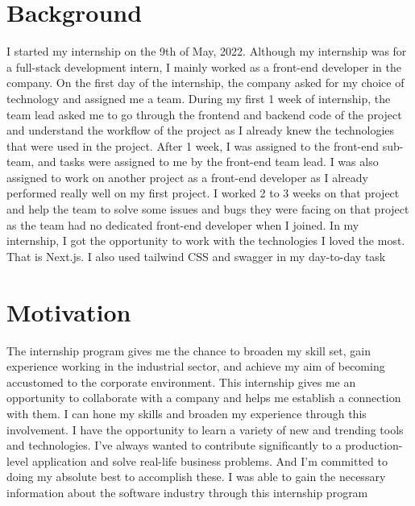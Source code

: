 \section{Background}
\begin{flushleft}
    I started my internship on the 9th of May, 2022. Although my internship was for a full-stack
development intern, I mainly worked as a front-end developer in the company. On the first day of
the internship, the company asked for my choice of technology and assigned me a team. During
my first 1 week of internship, the team lead asked me to go through the frontend and backend
code of the project and understand the workflow of the project as I already knew the
technologies that were used in the project. After 1 week, I was assigned to the front-end
sub-team, and tasks were assigned to me by the front-end team lead.
I was also assigned to work on another project as a front-end developer as I already performed
really well on my first project. I worked 2 to 3 weeks on that project and help the team to solve
some issues and bugs they were facing on that project as the team had no dedicated front-end
developer when I joined.
In my internship, I got the opportunity to work with the technologies I loved the most. That is
Next.js. I also used tailwind CSS and swagger in my day-to-day task
\end{flushleft}


\section{Motivation}
\begin{flushleft}
    The internship program gives me the chance to broaden my skill set, gain experience working in
the industrial sector, and achieve my aim of becoming accustomed to the corporate
environment. This internship gives me an opportunity to collaborate with a company and helps
me establish a connection with them. I can hone my skills and broaden my experience through
this involvement. I have the opportunity to learn a variety of new and trending tools and
technologies. I've always wanted to contribute significantly to a production-level application and
solve real-life business problems. And I'm committed to doing my absolute best to accomplish
these. I was able to gain the necessary information about the software industry through this
internship program
\end{flushleft}


